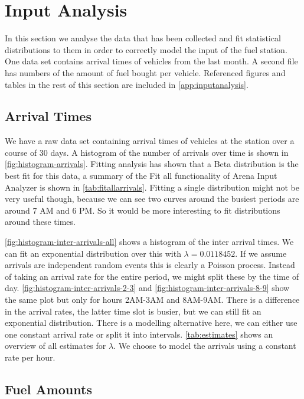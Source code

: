 \section{Input Analysis}

In this section we analyse the data that has been collected and fit statistical distributions to them in order to correctly model the input of the fuel station. 
One data set contains arrival times of vehicles from the last month. 
A second file has numbers of the amount of fuel bought per vehicle.  
Referenced figures and tables in the rest of this section are included in \autoref{app:inputanalysis}.

\subsection{Arrival Times}

We have a raw data set containing arrival times of vehicles at the station over a course of 30 days.
A histogram of the number of arrivals over time is shown in \autoref{fig:histogram-arrivals}.
Fitting analysis has shown that a Beta distribution is the best fit for this data, a summary of the Fit all functionality of Arena Input Analyzer is shown in \autoref{tab:fitallarrivals}.
Fitting a single distribution might not be very useful though, because we can see two curves around the busiest periods are around 7 AM and 6 PM.
So it would be more interesting to fit distributions around these times.

\autoref{fig:histogram-inter-arrivals-all} shows a histogram of the inter arrival times. 
We can fit an exponential distribution over this with $\lambda = 0.0118452$. 
If we assume arrivals are independent random events this is clearly a Poisson process. Instead of taking an arrival rate for the entire period, we might split these by the time of day.
\autoref{fig:histogram-inter-arrivals-2-3} and \autoref{fig:histogram-inter-arrivals-8-9} show the same plot but only for hours 2AM-3AM and 8AM-9AM. 
There is a difference in the arrival rates, the latter time slot is busier, but we can still fit an exponential distribution. 
There is a modelling alternative here, we can either use one constant arrival rate or split it into intervals. \autoref{tab:estimates} shows an overview of all estimates for $\lambda$.
We choose to model the arrivals using a constant rate per hour.

\subsection{Fuel Amounts}

